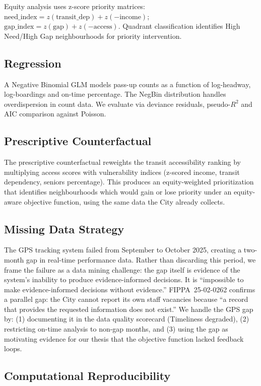 \documentclass[11pt]{article}
\begin{document}
Equity analysis uses z-score priority matrices:
$\text{need\_index} = z(\text{transit\_dep}) + z(-\text{income})$;
$\text{gap\_index} = z(\text{gap}) + z(-\text{access})$.
Quadrant classification identifies High Need/High Gap neighbourhoods for priority intervention.

\subsection{Regression}

A Negative Binomial GLM models pass-up counts as a function of log-headway, log-boardings and on-time percentage. The NegBin distribution handles overdispersion in count data. We evaluate via deviance residuals, pseudo-$R^2$ and AIC comparison against Poisson.

\subsection{Prescriptive Counterfactual}

The prescriptive counterfactual reweights the transit accessibility ranking by multiplying access scores with vulnerability indices (z-scored income, transit dependency, seniors percentage). This produces an equity-weighted prioritization that identifies neighbourhoods which would gain or lose priority under an equity-aware objective function, using the same data the City already collects.

\subsection{Missing Data Strategy}

The GPS tracking system failed from September to October 2025, creating a two-month gap in real-time performance data. Rather than discarding this period, we frame the failure as a data mining challenge: the gap itself is evidence of the system's inability to produce evidence-informed decisions. It is ``impossible to make evidence-informed decisions without evidence.'' FIPPA~25-02-0262 confirms a parallel gap: the City cannot report its own staff vacancies because ``a record that provides the requested information does not exist.'' We handle the GPS gap by: (1) documenting it in the data quality scorecard (Timeliness degraded), (2) restricting on-time analysis to non-gap months, and (3) using the gap as motivating evidence for our thesis that the objective function lacked feedback loops.

\subsection{Computational Reproducibility}
\end{document}
